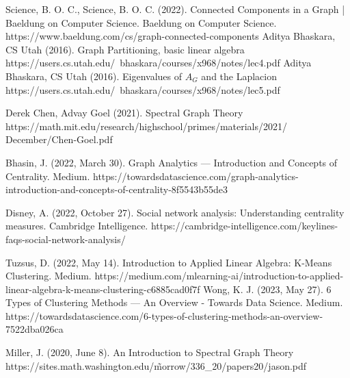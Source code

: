 \documentclass[12pt, a4paper]{article}
\begin{document}
    \begin{thebibliography}{9}
    Science, B. O. C., Science, B. O. C. (2022). Connected Components in a Graph | Baeldung on Computer Science. Baeldung on Computer Science. https://www.baeldung.com/cs/graph-connected-components
    Aditya Bhaskara, CS Utah (2016). Graph Partitioning, basic linear algebra https://users.cs.utah.edu/~bhaskara/courses/x968/notes/lec4.pdf
    Aditya Bhaskara, CS Utah (2016). Eigenvalues of $A_G$ and the Laplacion https://users.cs.utah.edu/~bhaskara/courses/x968/notes/lec5.pdf

    Derek Chen, Advay Goel (2021). Spectral Graph Theory https://math.mit.edu/research/highschool/primes/materials/2021/\\December/Chen-Goel.pdf

    Bhasin, J. (2022, March 30). Graph Analytics — Introduction and Concepts of Centrality. Medium. https://towardsdatascience.com/graph-analytics-introduction-and-concepts-of-centrality-8f5543b55de3

    Disney, A. (2022, October 27). Social network analysis: Understanding centrality measures. Cambridge Intelligence. https://cambridge-intelligence.com/keylines-faqs-social-network-analysis/

    Tuzsus, D. (2022, May 14). Introduction to Applied Linear Algebra: K-Means Clustering. Medium. https://medium.com/mlearning-ai/introduction-to-applied-linear-algebra-k-means-clustering-c6885cad0f7f
    Wong, K. J. (2023, May 27). 6 Types of Clustering Methods — An Overview - Towards Data Science. Medium. https://towardsdatascience.com/6-types-of-clustering-methods-an-overview-7522dba026ca

    Miller, J. (2020, June 8). An Introduction to Spectral Graph Theory https://sites.math.washington.edu/\~morrow/336\_20/papers20/jason.pdf

    \end{thebibliography}
\end{document}
